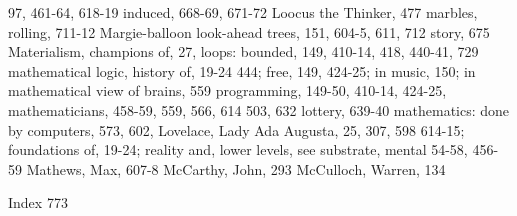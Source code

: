 97, 461-64, 618-19                             induced, 668-69, 671-72
Loocus the Thinker, 477                        marbles, rolling, 711-12 Margie-balloon
look-ahead trees, 151, 604-5, 611, 712         story, 675 Materialism, champions of, 27,
loops: bounded, 149, 410-14, 418, 440-41,      729 mathematical logic, history of, 19-24
444; free, 149, 424-25; in music, 150; in      mathematical view of brains, 559
programming, 149-50, 410-14, 424-25,           mathematicians, 458-59, 559, 566, 614
503, 632 lottery, 639-40                       mathematics: done by computers, 573, 602,
Lovelace, Lady Ada Augusta, 25, 307, 598       614-15; foundations of, 19-24; reality and,
lower levels, see substrate, mental            54-58, 456-59
                                               Mathews, Max, 607-8 McCarthy, John,
                                               293 McCulloch, Warren, 134



Index                                                                                    773

